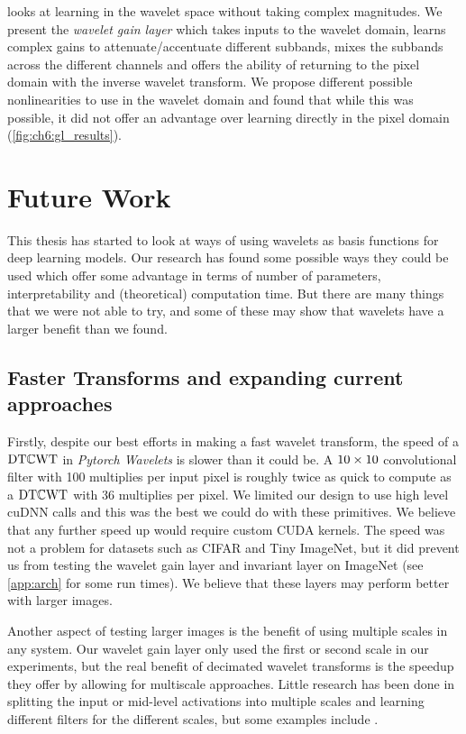 \textbf{} looks at learning in the wavelet space without
taking complex magnitudes. We present the \emph{wavelet gain layer} which takes
inputs to the wavelet domain, learns complex gains to attenuate/accentuate
different subbands, mixes the subbands across the different channels and offers
the ability of returning to the pixel domain with the inverse wavelet transform.
We propose different possible nonlinearities to use in the wavelet domain and
found that while this was possible, it did not offer an advantage over learning
directly in the pixel domain (\autoref{fig:ch6:gl_results}). 

\section{Future Work}
This thesis has started to look at ways of using wavelets as basis functions for
deep learning models. Our research has found some possible ways they could be used
which offer some advantage in terms of number of parameters, interpretability
and (theoretical) computation time. But there are many things that we were not
able to try, and some of these may show that wavelets have a larger benefit than
we found.

\subsection{Faster Transforms and expanding current approaches}
Firstly, despite our best efforts in making a fast wavelet transform, the speed
of a $\mathrm{DT}\mathbb{C}\mathrm{WT}$ in \emph{Pytorch Wavelets} is slower than it could be. A $10\times 10$
convolutional filter with 100 multiplies per input pixel is roughly twice as
quick to compute as a $\mathrm{DT}\mathbb{C}\mathrm{WT}$ with 36 multiplies per pixel. We limited our
design to use high level cuDNN calls and this was the best we could do with
these primitives. We believe that any further speed up would require custom CUDA
kernels. The speed was not a problem for datasets such as CIFAR and Tiny
ImageNet, but it did prevent us from testing the wavelet gain layer and
invariant layer on ImageNet (see \autoref{app:arch} for some run times).
We believe that these layers may perform better with larger images.

Another aspect of testing larger images is the benefit of using multiple
scales in any system. Our wavelet gain layer only used the first or second scale
in our experiments, but the real benefit of decimated wavelet transforms is the
speedup they offer by allowing for multiscale approaches. Little research has
been done in splitting the input or mid-level activations into multiple scales
and learning different filters for the different scales, but some examples
include \cite{haber_learning_2017, fujieda_wavelet_2018}.

